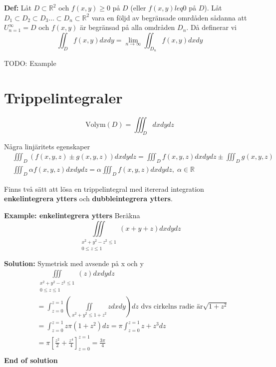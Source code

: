 \textbf{Def:} Låt $D\subset\mathbb{R}^2$ och $f(x,y) \geq 0$ på 
$D$ (eller $f(x,y)leq0$ på $D$). Låt $D_1\subset D_2\subset D_3 \ldots \subset D_n \subset\mathbb{R}^2$
vara en följd av begränsade omrdåden sådanna att $U^{\infty}_{n=1} = D$
och $f(x,y)$ är begränsad på alla omdråden $D_n$. Då definerar vi
\begin{equation*}
    \iint_D f(x,y)dxdy = \lim_{n\to\infty} \iint_{D_n} f(x,y)dxdy
\end{equation*}

TODO: Example


\section{Trippelintegraler}
\begin{equation*}
    \text{Volym}(D) = \iiint_D dxdydz
\end{equation*}


Några linjäritets egenskaper
\begin{align*}
    &\iiint_D \left(f(x,y,z) \pm g(x,y,z)\right)dxdydz 
    =\iiint_D f(x,y,z) dxdydz \pm \iiint_D g(x,y,z) \\
    &\iiint_D \alpha f(x,y,z) dxdydz 
    = \alpha \iiint_D f(x,y,z) dxdydz,\; \alpha \in \mathbb{R}
\end{align*}

Finns två sätt att lösa en trippelintegral med itererad integration
\textbf{enkelintegrera ytters} och \textbf{dubbleintegrera ytters}.

\textbf{Example: enkelintegrera ytters}
Beräkna 
\begin{equation*}
    \iiint\limits_{\substack{x^2+y^2-z^2\leq1 \\ 0\leq z\leq1}}(x+y+z)dxdydz
\end{equation*}

\textbf{Solution:}
Symetrisk med avsende på x och y
\begin{align*}
    &\iiint\limits_{\substack{x^2+y^2-z^2\leq1 \\ 0\leq z\leq1}}(z)dxdydz \\
    &=\int^{z=1}_{z=0}\left(\iint\limits_{x^2+y^2\leq 1+z^2} zdxdy\right) dz \text{ dvs cirkelns radie är} \sqrt{1+z^2} \\
    &=\int^{z=1}_{z=0} z\pi(1+z^2) dz =\pi\int^{z=1}_{z=0} z+z^3 dz \\
    &=\pi\left[ \frac{z^2}{2} + \frac{z^4}{4} \right]^{z=1}_{z=0} = \frac{3\pi}{4} \\
\end{align*}
\textbf{End of solution}


